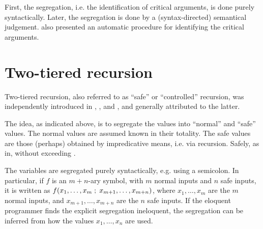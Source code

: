 First, the segregation, i.e. the identification of critical arguments, is done
purely syntactically. Later, the segregation is done by a (syntax-directed)
semantical judgement. \cite{caseiro-1996} also presented an automatic procedure
for identifying the critical arguments.






\section{Two-tiered recursion}

Two-tiered recursion, also referred to as ``safe'' or ``controlled'' recursion,
was independently introduced in \cite{simmons-1988}, \cite{leivant-1990}, and
\cite{bellantoni-cook-1992}, and generally attributed to the latter.

The idea, as indicated above, is to segregate the values into ``normal'' and
``safe'' values. The normal values are assumed known in their totality. The
safe values are those (perhaps) obtained by impredicative means, i.e. via
recursion\cite{bellantoni-cook-1992, clote-1999}. Safely, as in, without
exceeding \FPTIME{}.

The variables are segregated purely syntactically, e.g. using a semicolon. In
particular, if $f$ is an $m+n$-ary symbol, with $m$ normal inputs and $n$ safe
inputs, it is written as $f{\mathopen{}\left({x_1,\ldots,x_m \mathrel{};\mathrel{}{} x_{m+1},\ldots,x_{m+n}}\right)\mathclose{}}$,
where $x_1,\ldots,x_m$ are the $m$ normal inputs, and $x_{m+1},\ldots,x_{m+n}$
are the $n$ safe inputs. If the eloquent programmer finds the explicit
segregation ineloquent, the segregation can be inferred from how the values
$x_1,\ldots,x_n$ are used\cite{caseiro-1996}.

